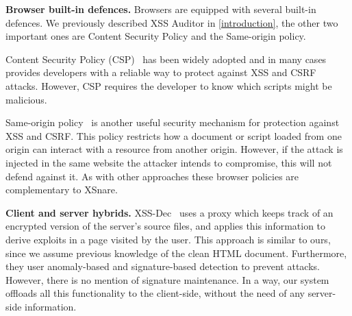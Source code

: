 \noindent \textbf{Browser built-in defences.}  Browsers are equipped
with several built-in defences. We previously described XSS
Auditor in \autoref{introduction}, the other two important ones are Content
Security Policy and the Same-origin policy.

Content Security Policy (CSP)~\cite{CSP} has been widely adopted and
in many cases provides developers with a reliable way to protect
against \ac{XSS} and CSRF attacks. However, CSP requires the developer to know which scripts
might be malicious.

Same-origin policy~\cite{SOP} is another useful security mechanism for
protection against \ac{XSS} and CSRF. This policy restricts how a
document or script loaded from one origin can interact with a resource
from another origin. However, if the attack is injected in the same
website the attacker intends to compromise, this will not defend
against it. As with other approaches these browser policies are complementary to XSnare.

\noindent \textbf{Client and server hybrids.}
XSS-Dec~\cite{Sundareswaran:2012:XHS:2352970.2352994} uses a proxy which keeps track of an encrypted version of the server's source files, and applies this information to derive exploits in a page visited by the user. This approach is similar to ours, since we assume previous
knowledge of the clean HTML document. Furthermore, they user anomaly-based and signature-based detection to prevent attacks. However, there is no mention of signature maintenance. In a way, our system offloads all this functionality to the client-side, without the need of any server-side information.

